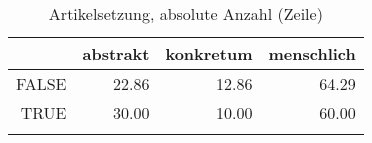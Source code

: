\begin{table}[ht]
\centering
\begin{tabular}{rrrr}
  \lsptoprule
 & abstrakt & konkretum & menschlich \\ 
  \midrule
FALSE & 22.86 & 12.86 & 64.29 \\ 
  TRUE & 30.00 & 10.00 & 60.00 \\ 
   \lspbottomrule
\end{tabular}
\caption{Artikelsetzung, absolute Anzahl (Zeile)} 
\end{table}
